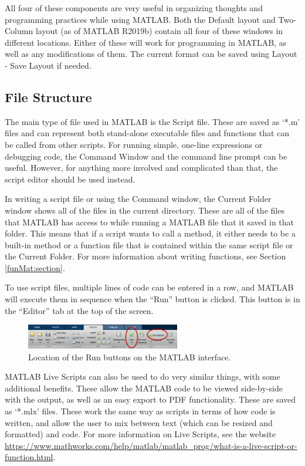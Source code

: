 All four of these components are very useful in organizing thoughts and programming practices while using MATLAB. Both the Default layout and Two-Column layout (as of MATLAB R2019b) contain all four of these windows in different locations. Either of these will work for programming in MATLAB, as well as any modifications of them. The current format can be saved using Layout - Save Layout if needed.

\subsection{File Structure}

The main type of file used in MATLAB is the Script file. These are saved as `*.m' files and can represent both stand-alone executable files and functions that can be called from other scripts. For running simple, one-line expressions or debugging code, the Command Window and the command line prompt can be useful. However, for anything more involved and complicated than that, the script editor should be used instead.

In writing a script file or using the Command window, the Current Folder window shows all of the files in the current directory. These are all of the files that MATLAB has access to while running a MATLAB file that it saved in that folder. This means that if a script wants to call a method, it either needs to be a built-in method or a function file that is contained within the same script file or the Current Folder. For more information about writing functions, see Section \ref{funMat:section}. 

To use script files, multiple lines of code can be entered in a row, and MATLAB will execute them in sequence when the ``Run'' button is clicked. This button is in the ``Editor'' tab at the top of the screen.
\begin{figure}[h]
    \centering
    \includegraphics[width=0.6\textwidth]{Images/MatlabDemo_runButtons.png}
    \caption{Location of the Run buttons on the MATLAB interface.}
    \label{fig:MatlabDemo_Run}
\end{figure}

MATLAB Live Scripts can also be used to do very similar things, with some additional benefits. These allow the MATLAB code to be viewed side-by-side with the output, as well as an easy export to PDF functionality. These are saved as `*.mlx' files. These work the same way as scripts in terms of how code is written, and allow the user to mix between text (which can be resized and formatted) and code. For more information on Live Scripts, see the website \url{https://www.mathworks.com/help/matlab/matlab_prog/what-is-a-live-script-or-function.html}. 

